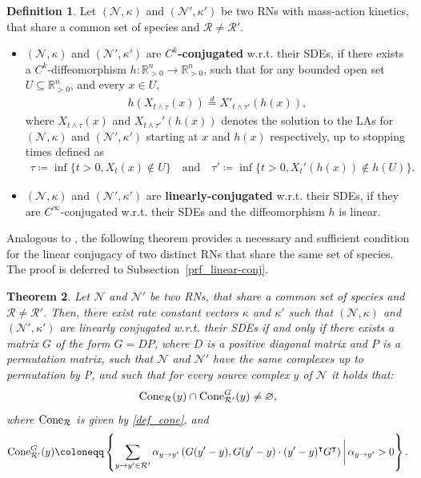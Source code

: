 \documentclass[10pt,a4paper]{amsart}
\let\emptyset\varnothing
\newtheorem{theorem}{Theorem}[section]
\theoremstyle{definition}
\newtheorem{definition}[theorem]{Definition}
\theoremstyle{remark}
\theoremstyle{consequence}
\def\k{\kappa}
\def\cN{\mathcal{N}}
\def\cR{\mathcal{R}}
\def\R{\mathbb{R}}
\numberwithin{equation}{section}
\begin{document}
\begin{definition}
 Let $(\cN, \k)$ and $(\cN', \k')$ be two RNs with mass-action kinetics, that share a common set of species and $\cR \neq \cR'$.
    \begin{itemize}
      \item $(\cN, \k)$ and $(\cN', \k')$ are \textbf{$C^k$-conjugated} w.r.t. their SDEs, if there exists a $C^k$-diffeomorphism $h \colon \R_{>0}^n \to \R_{> 0}^n$, such that for any bounded open set $U \subseteq \R_{> 0}^n$, and every $x \in U$,
      \begin{align}\label{linear_map}
      h(X_{t \wedge \tau}(x)) \overset{d}{=} X'_{t \wedge \tau'} (h(x)), 
      \end{align}
      where $X_{t \wedge \tau}  (x)$ and $X_{t\wedge \tau'}' (h(x))$ denotes the solution to the LAs for $(\cN, \k)$ and $(\cN',\k')$ starting at $x$ and $h(x)$ respectively, up to stopping times defined as
      \begin{align}\label{def_tau-tau'}
        \tau \coloneqq \inf \{t > 0, X_t (x) \notin U\}\quad \text{and} \quad \tau' \coloneqq \inf \big\{t > 0, X_t'(h(x)) \notin h(U)\big\}.
        \end{align}

        \item $(\cN, \k)$ and $(\cN', \k')$  are \textbf{linearly-conjugated} w.r.t. their SDEs, if they are $C^{\infty}$-conjugated w.r.t. their SDEs and the diffeomorphism $h$ is linear.
    \end{itemize}
     
\end{definition}


Analogous to \cite{johnston2011linear}, the following theorem provides a necessary and sufficient condition for the linear conjugacy of two distinct RNs that share the same set of species. The proof is deferred to Subsection~\ref{prf_linear-conj}.
\begin{theorem}\label{thm_linear-conj}
  Let $\cN$ and $\cN'$ be two RNs, that share a common set of species and $\cR \neq \cR'$. Then, there exist rate constant vectors $\k$ and $\k'$ such that $(\cN, \k)$ and $(\cN', \k')$ are linear{ly} conjugate{d} w.r.t. their SDEs if and only if there exists a matrix $G$ of the form $G = DP$, where $D$ is a
positive diagonal matrix and $P$ is a permutation matrix, such that $\mathcal{N}$ and $\mathcal{N}'$ have the same complexes up to permutation by P,
and such that for every source complex $y$ of $\mathcal{N}$ it holds that:
  \[
    {\rm Cone}_{\cR} (y) \cap  {\rm Cone}^G_{\cR'} (y) \neq \emptyset,
  \] 
  where ${\rm Cone}_{\cR}$ is given by \eqref{def_cone}, and
  \[
    {\rm Cone}^G_{\cR'} (y) \coloneqq \left\{\sum_{y\to y'\in \cR'}\alpha_{y\to y'}  \left(G(y' - y),G (y' - y) \cdot (y' - y)^{\intercal} G^{\intercal}\right)\bigg|\, \alpha_{y\to y'}>0\right\} .
  \]
\end{theorem}
\end{document}
